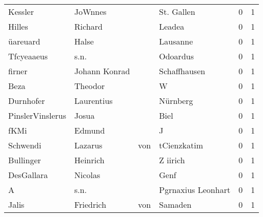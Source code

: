\begin{center}
\begin{tiny}
\begin{longtabu}{llllrr}
                  Kessler &                            JoWnnes &             &                                  St. Gallen &          0 &         1 \\
                   Hilles &                            Richard &             &                                      Leadea &          0 &         1 \\
                 üareuard &                              Halse &             &                                    Lausanne &          0 &         1 \\
               Tfcyeaaeus &                               s.n. &             &                                    Odoardus &          0 &         1 \\
                   firner &                      Johann Konrad &             &                                Schaffhausen &          0 &         1 \\
                     Beza &                            Theodor &             &                                           W &          0 &         1 \\
                Durnhofer &                         Laurentius &             &                                    Nürnberg &          0 &         1 \\
         PinslerVinslerus &                              Josua &             &                                        Biel &          0 &         1 \\
                     fKMi &                             Edmund &             &                                           J &          0 &         1 \\
                 Schwendi &                            Lazarus &         von &                                 tCienzkatim &          0 &         1 \\
                Bullinger &                           Heinrich &             &                                    Z iirich &          0 &         1 \\
               DesGallara &                            Nicolas &             &                                        Genf &          0 &         1 \\
                        A &                               s.n. &             &                          Pgrnaxius Leonhart &          0 &         1 \\
                    Jalis &                          Friedrich &         von &                                     Samaden &          0 &         1 \\

\end{longtabu}
\end{tiny}
\end{center}

